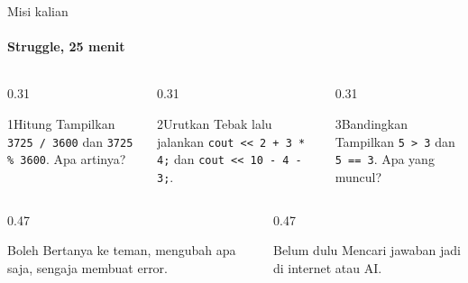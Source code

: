 \documentclass[t]{beamer}
\begin{document}

\begin{frame}{Misi kalian}
\framesubtitle{Struggle, 25 menit}
\begin{columns}[T]
\begin{column}{0.31\textwidth}
\begin{Langkah}{1}{Hitung}
Tampilkan \texttt{3725 / 3600} dan \texttt{3725 \% 3600}. Apa artinya?
\end{Langkah}
\end{column}
\begin{column}{0.31\textwidth}
\begin{Langkah}{2}{Urutkan}
Tebak lalu jalankan \texttt{cout << 2 + 3 * 4;} dan \texttt{cout << 10 - 4 - 3;}.
\end{Langkah}
\end{column}
\begin{column}{0.31\textwidth}
\begin{Langkah}{3}{Bandingkan}
Tampilkan \texttt{5 > 3} dan \texttt{5 == 3}. Apa yang muncul?
\end{Langkah}
\end{column}
\end{columns}
\vspace{8pt}
\begin{columns}[T]
\begin{column}{0.47\textwidth}
\begin{Blok}{Boleh}
Bertanya ke teman, mengubah apa saja, sengaja membuat error.
\end{Blok}
\end{column}
\begin{column}{0.47\textwidth}
\begin{BlokAlert}{Belum dulu}
Mencari jawaban jadi di internet atau AI.
\end{BlokAlert}
\end{column}
\end{columns}
\end{frame}
\end{document}
